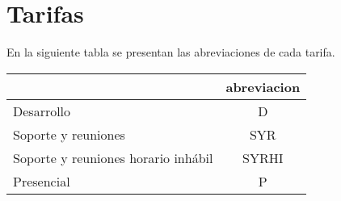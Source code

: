 \documentclass{article}
\begin{document}
\section{Tarifas}
    En la siguiente tabla se presentan las abreviaciones de cada tarifa.
\begin{table}[htbp]
    \centering
    \begin{tabular}{|p{6cm}|c|}
        \hline
        \centering{\textbf{Nombre}} & \textbf{abreviacion} \\ \hline  Desarrollo &  \label{D}D  \\ \hline 
 Soporte y reuniones &  \label{SYR}SYR  \\ \hline 
 Soporte y reuniones horario inhábil &  \label{SYRHI}SYRHI  \\ \hline 
 Presencial &  \label{P}P  \\ \hline 

    \end{tabular}
\end{table} 
 
\end{document}
